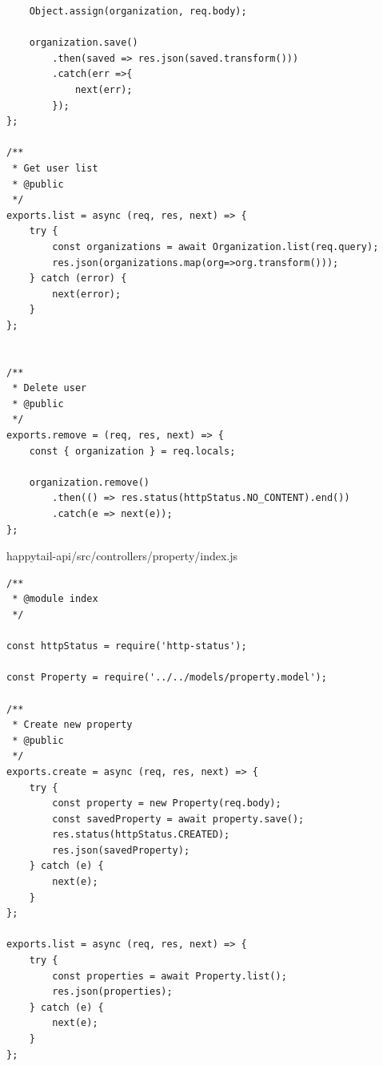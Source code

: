 \documentclass[12pt]{article}
\begin{document}
\begin{verbatim}
    Object.assign(organization, req.body);

    organization.save()
        .then(saved => res.json(saved.transform()))
        .catch(err =>{
            next(err);
        });
};

/**
 * Get user list
 * @public
 */
exports.list = async (req, res, next) => {
    try {
        const organizations = await Organization.list(req.query);
        res.json(organizations.map(org=>org.transform()));
    } catch (error) {
        next(error);
    }
};


/**
 * Delete user
 * @public
 */
exports.remove = (req, res, next) => {
    const { organization } = req.locals;

    organization.remove()
        .then(() => res.status(httpStatus.NO_CONTENT).end())
        .catch(e => next(e));
};

 \end{verbatim}
 
  \normalsize
 happytail-api/src/controllers/property/index.js
 \footnotesize
\begin{verbatim}
/**
 * @module index
 */

const httpStatus = require('http-status');

const Property = require('../../models/property.model');

/**
 * Create new property
 * @public
 */
exports.create = async (req, res, next) => {
    try {
        const property = new Property(req.body);
        const savedProperty = await property.save();
        res.status(httpStatus.CREATED);
        res.json(savedProperty);
    } catch (e) {
        next(e);
    }
};

exports.list = async (req, res, next) => {
    try {
        const properties = await Property.list();
        res.json(properties);
    } catch (e) {
        next(e);
    }
};
 \end{verbatim}
 
\end{document}
